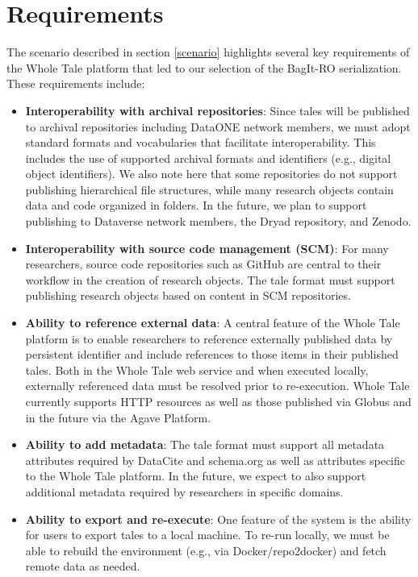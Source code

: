 \documentclass[conference]{IEEEtran}
\begin{document}
\section{Requirements}  \label{requirements}
The scenario described in section \ref{scenario} highlights several key requirements of the 
Whole Tale platform that led to our selection of the BagIt-RO serialization.  These requirements include:

\begin{itemize}
\item{{\bf Interoperability with archival repositories}: Since tales will be published to archival repositories including DataONE network members, we must adopt standard formats and vocabularies that facilitate interoperability. This includes the use of supported archival formats and identifiers (e.g., digital object identifiers). We also note here that some repositories do not support publishing hierarchical file structures, while many research objects contain data and code organized in folders. In the future, we plan to support publishing to Dataverse network members, the Dryad repository, and Zenodo.}
\item{{\bf Interoperability with source code management (SCM)}: For many researchers, source code repositories such as GitHub are central to their workflow in the creation of research objects. The tale format must support publishing research objects based on content in SCM repositories.}
\item{{\bf Ability to reference external data}: A central feature of the Whole Tale platform is to enable researchers to reference externally published data by persistent identifier and include references to those items in their published tales. Both in the Whole Tale web service and when executed locally, externally referenced data must be resolved prior to re-execution. Whole Tale currently supports HTTP resources as well as those published via Globus and in the future via the Agave Platform.}
\item{{\bf Ability to add metadata}: The tale format must support all metadata attributes required by DataCite and schema.org as well as attributes specific to the Whole Tale platform. In the future, we expect to also support additional metadata required by researchers in specific domains.}
\item{{\bf Ability to export and re-execute}: One feature of the system is the ability for users to export tales to a local machine. To re-run locally, we must be able to rebuild the environment (e.g., via Docker/repo2docker) and fetch remote data as needed.}

\end{itemize}
\end{document}
